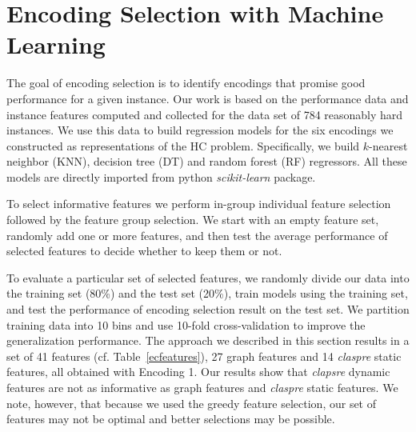 \documentclass[submission,copyright,creativecommons]{eptcs}
\begin{document}
\section{Encoding Selection with Machine Learning}
The goal of encoding selection is to identify encodings
that promise good performance for a given instance. Our work is based on the performance data and instance features computed and
collected for the data set of 784 reasonably hard instances. We use 
this data to build regression models for the six encodings we constructed as 
representations of the HC problem. Specifically, we build $k$-nearest neighbor
(KNN), decision tree (DT) and random forest (RF) regressors. All these models 
are directly imported from python \emph{scikit-learn} package. 

To select informative features %
we perform 
in-group individual feature selection followed by the feature group 
selection. We start with an empty feature set, randomly add one or more 
features, and then test the average performance of selected features to decide whether to 
keep them or not.

To evaluate a particular set of selected features, we randomly divide our data 
into the training set (80\%) and the test set (20\%), train models using the
training set, and test the performance of encoding selection result on the
test set. 
We partition training data into 10 bins and use 10-fold cross-validation
to improve the generalization performance.
The approach we described in this section results in a set of 41 features
(cf. Table~\ref{ecfeatures}), 27 graph features and 14 \emph{claspre} static 
features, all obtained with Encoding 1. 
Our results show that \emph{clapsre} dynamic features are not as informative as
graph features and \emph{claspre} static features. We note, however, that because we 
used the greedy feature selection, our set of features may not be optimal and 
better selections may be possible.
\end{document}
